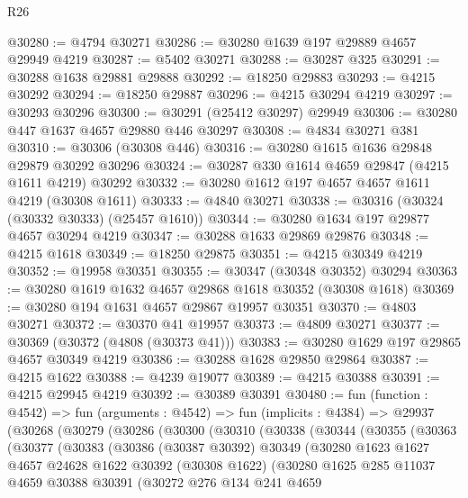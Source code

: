 \begin{lexlean}{R26}
\begin{coremodule}
@30280 := @4794 @30271
@30286 := @30280 @1639 @197 @29889 @4657 @29949 @4219
@30287 := @5402 @30271
@30288 := @30287 @325
@30291 := @30288 @1638 @29881 @29888
@30292 := @18250 @29883
@30293 := @4215 @30292
@30294 := @18250 @29887
@30296 := @4215 @30294 @4219
@30297 := @30293 @30296
@30300 := @30291 (@25412 @30297) @29949
@30306 := @30280 @447 @1637 @4657 @29880 @446 @30297
@30308 := @4834 @30271 @381
@30310 := @30306 (@30308 @446)
@30316 := @30280 @1615 @1636 @29848 @29879 @30292 @30296
@30324 := @30287 @330 @1614 @4659 @29847 (@4215 @1611 @4219) @30292
@30332 := @30280 @1612 @197 @4657 @4657 @1611 @4219 (@30308 @1611)
@30333 := @4840 @30271
@30338 := @30316 (@30324 (@30332 @30333) (@25457 @1610))
@30344 := @30280 @1634 @197 @29877 @4657 @30294 @4219
@30347 := @30288 @1633 @29869 @29876
@30348 := @4215 @1618
@30349 := @18250 @29875
@30351 := @4215 @30349 @4219
@30352 := @19958 @30351
@30355 := @30347 (@30348 @30352) @30294
@30363 := @30280 @1619 @1632 @4657 @29868 @1618 @30352 (@30308 @1618)
@30369 := @30280 @194 @1631 @4657 @29867 @19957 @30351
@30370 := @4803 @30271
@30372 := @30370 @41 @19957
@30373 := @4809 @30271
@30377 := @30369 (@30372 (@4808 (@30373 @41)))
@30383 := @30280 @1629 @197 @29865 @4657 @30349 @4219
@30386 := @30288 @1628 @29850 @29864
@30387 := @4215 @1622
@30388 := @4239 @19077
@30389 := @4215 @30388
@30391 := @4215 @29945 @4219
@30392 := @30389 @30391
@30480 := fun (function : @4542) =>
  fun (arguments : @4542) =>
  fun (implicits : @4384) =>
  @29937
    (@30268
      (@30279
        (@30286
          (@30300
            (@30310
              (@30338
                (@30344
                  (@30355
                    (@30363
                      (@30377
                        (@30383
                          (@30386
                            (@30387 @30392)
                            @30349
                            (@30280
                              @1623
                              @1627
                              @4657
                              @24628
                              @1622
                              @30392
                              (@30308 @1622)
                              (@30280
                                @1625
                                @285
                                @11037
                                @4659
                                @30388
                                @30391
                                (@30272
                                  @276
                                  @134
                                  @241
                                  @4659

\end{coremodule}
\end{lexlean}
